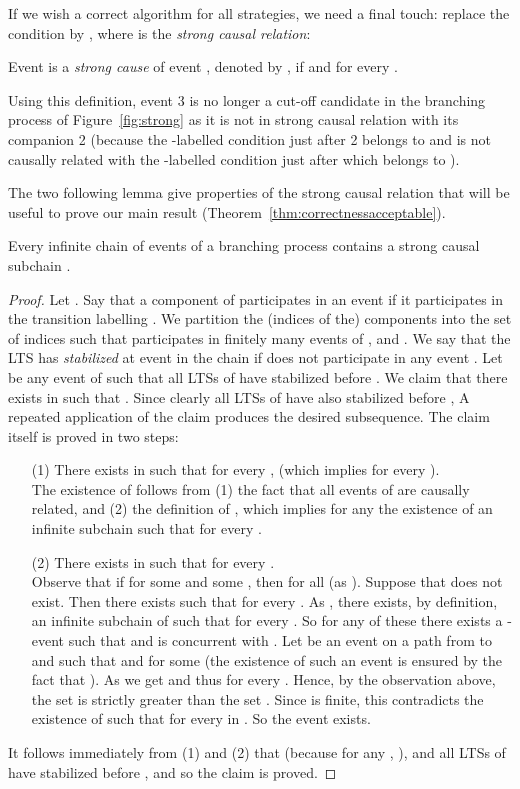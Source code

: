 \documentclass{llncs}
\begin{document}
If we wish a correct algorithm for all strategies, we need a final touch: replace the condition  by , where  is the {\em strong causal relation}:
\begin{definition}
Event  is a {\em strong cause} of event , denoted by ,
if  and  for every . 
\end{definition}

Using this definition, event 3 is no longer a cut-off candidate in the branching process of Figure~\ref{fig:strong} as it is not in strong causal relation with its companion 2 (because the -labelled condition just after 2 belongs to  and is not causally related with the -labelled condition just after  which belongs to ).

The two following lemma give properties of the strong causal relation that will be useful to prove our main result (Theorem~\ref{thm:correctnessacceptable}).

\begin{lemma}
\label{lem:causal}
Every infinite chain  of events of a branching process
contains a strong causal subchain . 
\end{lemma}
\begin{proof}
Let . Say that a component  of  participates
in an event  if it participates in the transition labelling . We partition the (indices of the)
components into the set  of indices  such that  participates in finitely many 
events of , and . We say that the LTS  has 
{\em stabilized} at event  in the chain if  does not participate in any event . 
Let  be any event of  such that all LTSs of  
have stabilized before . We claim that there exists  in  such that
. Since clearly all LTSs of  have also stabilized before ,
A repeated application of the claim produces the desired subsequence. The claim itself
is proved in two steps:
\begin{itemize}
\item[(1)] There exists  in  such that 
for every , (which implies  for every ).\\
The existence of  follows from (1) the fact that all events of  are causally related, and (2) the definition of , which implies for any  the existence of an infinite subchain  such that  for every .
\item[(2)] There exists  in  such that  for every .\\
Observe that if  for some  and some , then  for all  (as ).
Suppose that  does not exist.
Then there exists  such that  for every .
As , there exists, by definition, an infinite subchain  of  such that  for every .
So for any of these  there exists a -event  such that 
 and  is concurrent with .
Let  be an event on a path from  to  and such that 
 and  for some  (the existence of such an event is ensured by the fact that ).
As  we get  and thus  for every .
Hence, by the observation above, the set  is strictly greater than the set .
Since  is finite, this contradicts the existence of  such that 
 for every  in . So the event  exists.
\end{itemize}
It follows immediately from (1) and (2) that  (because for any , ), and all LTSs of  have stabilized before , and so the claim is proved.
\end{proof}
\end{document}
